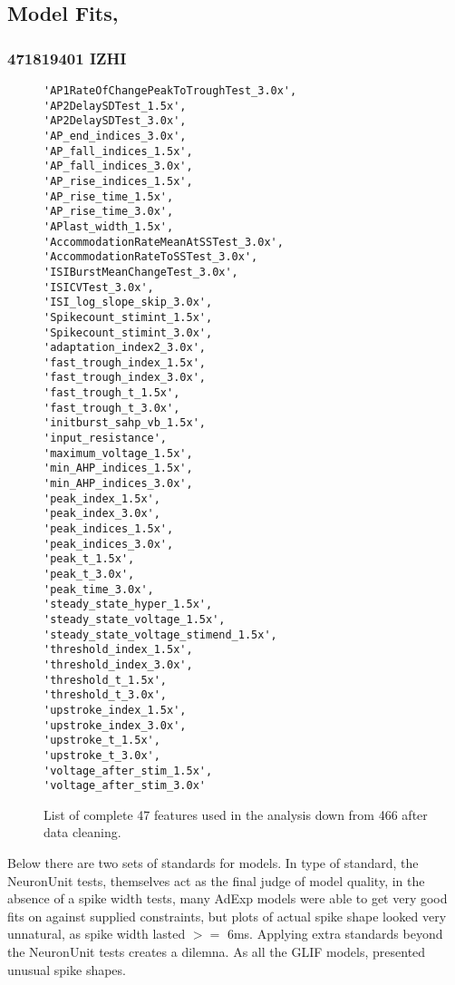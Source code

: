 
\subsection{Model Fits,}
\subsubsection{471819401 IZHI}



\begin{figure}
\begin{verbatim}
'AP1RateOfChangePeakToTroughTest_3.0x',
'AP2DelaySDTest_1.5x',
'AP2DelaySDTest_3.0x',
'AP_end_indices_3.0x',
'AP_fall_indices_1.5x',
'AP_fall_indices_3.0x',
'AP_rise_indices_1.5x',
'AP_rise_time_1.5x',
'AP_rise_time_3.0x', 
'APlast_width_1.5x',
'AccommodationRateMeanAtSSTest_3.0x', 
'AccommodationRateToSSTest_3.0x',
'ISIBurstMeanChangeTest_3.0x', 
'ISICVTest_3.0x',
'ISI_log_slope_skip_3.0x', 
'Spikecount_stimint_1.5x',
'Spikecount_stimint_3.0x', 
'adaptation_index2_3.0x',
'fast_trough_index_1.5x', 
'fast_trough_index_3.0x',
'fast_trough_t_1.5x', 
'fast_trough_t_3.0x', 
'initburst_sahp_vb_1.5x',
'input_resistance', 
'maximum_voltage_1.5x', 
'min_AHP_indices_1.5x',
'min_AHP_indices_3.0x', 
'peak_index_1.5x', 
'peak_index_3.0x',
'peak_indices_1.5x', 
'peak_indices_3.0x',
'peak_t_1.5x',
'peak_t_3.0x',
'peak_time_3.0x',
'steady_state_hyper_1.5x',
'steady_state_voltage_1.5x', 
'steady_state_voltage_stimend_1.5x',
'threshold_index_1.5x', 
'threshold_index_3.0x',
'threshold_t_1.5x',
'threshold_t_3.0x',
'upstroke_index_1.5x',
'upstroke_index_3.0x',
'upstroke_t_1.5x', 
'upstroke_t_3.0x', 
'voltage_after_stim_1.5x',
'voltage_after_stim_3.0x'   
\end{verbatim}
\label{fig:reference_feature_list}
List of complete 47 features used in the analysis down from 466 after data cleaning.

\end{figure}


Below there are two sets of standards for models. In type of standard, the NeuronUnit tests, themselves act as the final judge of model quality, in the absence of a spike width tests, many AdExp models were able to get very good fits on against supplied constraints, but plots of actual spike shape looked very unnatural, as spike width lasted $>=$ 6ms. Applying extra standards beyond the NeuronUnit tests creates a dilemna. As all the GLIF models, presented unusual spike shapes.



